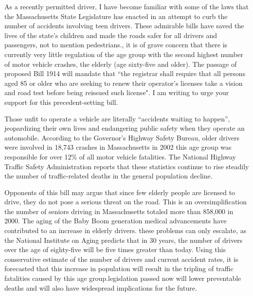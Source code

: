 \begin{spacing}{2}
\begin{linenumbers*}
\modulolinenumbers[5]
\indent As a recently permitted driver, I have become familiar with some of the laws that the Massachusetts State Legislature has enacted in an attempt to curb the number of accidents involving teen drivers. These admirable bills have saved the lives of the state's children and made the roads safer for all drivers and passengers, not to mention pedestrians.\longline, it is of grave concern that there is currently very little regulation of the age group with the second highest number of motor vehicle crashes, the elderly (age sixty-five and older). The passage of proposed Bill 1914 will mandate that ``the registrar shall require that all persons aged 85 or older who are seeking to renew their operator's licenses take a vision and road test before being reissued such license". \longline I am writing to urge your support for this precedent-setting bill.

\indent Those unfit to operate a vehicle are literally “accidents waiting to happen”, jeopardizing their own lives and endangering public safety when they operate an automobile. According to the Governor's Highway Safety Bureau, older drivers were involved in 18,743 crashes in Massachusetts in 2002 \longline this age group was responsible for over 12\% of all motor vehicle fatalities. The National Highway Traffic Safety Administration reports that these statistics continue to rise steadily \longline the number of traffic-related deaths in the general population decline.

\indent Opponents of this bill may argue that since few elderly people are licensed to drive, they do not pose a serious threat on the road. This is an oversimplification \longline the number of seniors driving in Massachusetts totaled more than 858,000 in 2000. The aging of the Baby Boom generation \longline medical advancements have contributed to an increase in elderly drivers. \longline these problems can only escalate, as the National Institute on Aging predicts that in 30 years, the number of drivers over the age of eighty-five will be five times greater than today. Using this conservative estimate of the number of drivers and current accident rates, it is forecasted that this increase in population will result in the tripling of traffic fatalities caused by this age group.\longline legislation passed now will lower preventable deaths and will also have widespread implications for the future.


\end{linenumbers*}
\end{spacing}

